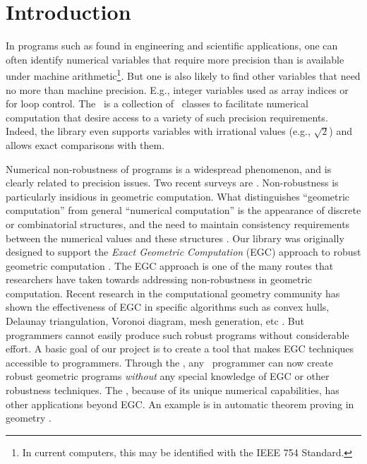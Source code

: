 \documentclass[12pt]{article}
\begin{document}
\cleardoublepage

\section{Introduction}

In programs such as found in
engineering and scientific applications, one can often
identify numerical variables that require more
precision than is available under machine arithmetic\footnote{
In current computers, this may be identified with
the IEEE 754 Standard.
}.
But one is also likely to find
other variables that need no more than machine precision.
E.g., integer variables used as array indices or for loop control.
The \corelib\ is a collection of \cpp\ classes
to facilitate numerical computation
that desire access to a variety of such precision requirements.
Indeed, the library even supports variables with irrational
values (e.g., $\sqrt{2}$) and allows exact comparisons with them.

Numerical non-robustness of programs is a widespread phenomenon,
and is clearly related to precision issues.
Two recent surveys are \cite{schirra:robustness-survey:98,yap:crc}.
Non-robustness is particularly insidious in geometric computation.
What distinguishes ``geometric computation'' from
general ``numerical computation'' is the appearance
of discrete or combinatorial structures, and the
need to maintain consistency requirements between
the numerical values and these structures \cite{yap:crc}.
Our library was originally designed to
support the {\em Exact Geometric Computation} (EGC)
approach to robust geometric computation
\cite{yap:exact,yap-dube:paradigm}.  The EGC approach
is one of the many routes that researchers have taken
towards addressing non-robustness in geometric computation.
Recent research in the computational geometry
community has shown the effectiveness
of EGC in specific algorithms such as
convex hulls, Delaunay triangulation, Voronoi diagram, mesh generation, etc
\cite{fortune-vanwyk:static:96,fortune-vanwyk:exact,kln:delaunay:91,bkmnsu:exact:95,burnikel:exact:thesis,shewchuk:adaptive:96}.
But programmers cannot easily produce such robust programs without
considerable effort.
A basic goal of our project is to create
a tool that makes EGC techniques accessible to  programmers.
Through the \corelib, any \candcpp\ programmer can now
create robust geometric programs
{\em without} any special knowledge of EGC or other robustness techniques.
The \corelib, because of its unique
numerical capabilities, has other applications beyond EGC.
An example is in automatic theorem proving in geometry
\cite{tyl:zero-test:00}.
\end{document}
